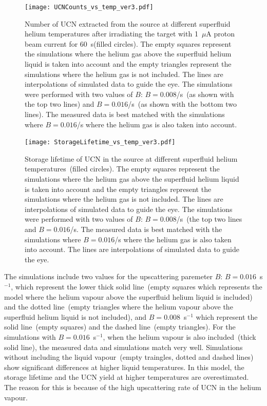 \begin{figure}[h!]
  \centering
  \texttt{[image: UCNCounts\_vs\_temp\_ver3.pdf]}
  \caption[UCN yield versus superfluid helium temperature data and
  simulations]{Number of UCN extracted from the source at different
    superfluid helium temperatures after irradiating the target with
    1~$\mu$A proton beam current for 60~s(filled circles). The empty
    squares represent the simulations where the helium gas above the
    superfluid helium liquid is taken into account and the empty
    triangles represent the simulations where the helium gas is not
    included. The lines are interpolations of simulated data to guide
    the eye. The simulations were performed with two values of $B$:
    $B = 0.008$/s~(as shown with the top two lines) and
    $B = 0.016$/s~(as shown with the bottom two lines). The measured
    data is best matched with the simulations where $B = 0.016$/s
    where the helium gas is also taken into account.}
  \label{fig:Counts_vs_temp_sim}
\end{figure}

\begin{figure}[h!]
  \centering
  \texttt{[image: StorageLifetime\_vs\_temp\_ver3.pdf]}
  \caption[UCN storage lifetime versus superfluid helium temperature
  data and simulations]{Storage lifetime of UCN in the source at
    different superfluid helium temperatures~(filled circles).  The
    empty squares represent the simulations where the helium gas above
    the superfluid helium liquid is taken into account and the empty
    triangles represent the simulations where the helium gas is not
    included. The lines are interpolations of simulated data to guide
    the eye. The simulations were performed with two values of $B$:
    $B = 0.008$/s~(the top two lines and $B = 0.016$/s. The measured
    data is best matched with the simulations where $B = 0.016$/s
    where the helium gas is also taken into account.  The lines are
    interpolations of simulated data to guide the eye.}
  \label{fig:storage_vs_temp_sim}
\end{figure}

The simulations include two values for the upscattering paremeter $B$:
$B= 0.016$~s$^{-1}$, which represent the lower thick solid line~(empty
squares which represents the model where the helium vapour above the
superfluid helium liquid is included) and the dotted line~(empty
triangles where the helium vapour above the superfluid helium liquid
is not included), and $B= 0.008$~s$^{-1}$ which represent the solid
line~(empty squares) and the dashed line~(empty triangles). For the
simulations with $B= 0.016$~s$^{-1}$, when the helium vapour is also
included~(thick solid line), the measured data and simulations match
very well. Simulations without including the liquid vapour~(empty
traingles, dotted and dashed lines) show significant differences at higher liquid
temperatures. In this model, the storage lifetime and the UCN yield at
higher temperatures are overestimated. The reason for this is because
of the high upscattering rate of UCN in the helium vapour.



